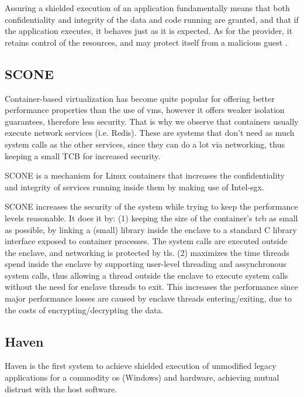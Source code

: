 Assuring a shielded execution of an application fundamentally means that both confidentiality and integrity of the data and code running are granted, and that if the application executes, it behaves just as it is expected. As for the provider, it retains control of the resources, and may protect itself from a malicious guest \cite{havenPaper}. 


\subsection{SCONE}

Container-based virtualization has become quite popular for offering better performance properties than the use of \gls{vm}s, however it offers weaker isolation guarantees, therefore less security. 
That is why we observe that containers usually execute network services (i.e. Redis). These are systems that don't need as much system calls as the other services, since they can do a lot via networking, thus keeping a small TCB for increased security.

SCONE \cite{sconePaper} is a mechanism for Linux containers that increases the confidentiality and integrity of services running inside them by making use of Intel-\gls{sgx}.

SCONE increases the security of the system while trying to keep the performance levels reasonable. 
It does it by: 
(1) keeping the size of the container's \gls{tcb} as small as possible, by linking a (small) library inside the enclave to a standard C library interface exposed to container processes. The system calls are executed outside the enclave, and networking is protected by \gls{tls}. 
(2) maximizes the time threads spend inside the enclave by supporting user-level threading and assynchronous system calls, thus allowing a thread outside the enclave to execute system calls without the need for enclave threads to exit.
This increases the performance since major performance losses are caused by enclave threads entering/exiting, due to the costs of encrypting/decrypting the data.



\subsection{Haven}

Haven is the first system to achieve shielded execution of unmodified legacy applications for a commodity \gls{os} (Windows) and hardware, achieving mutual distrust with the host software.

